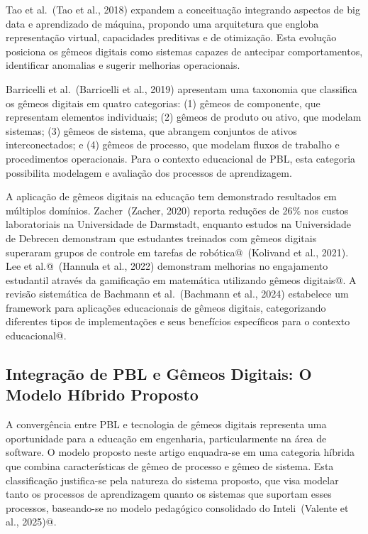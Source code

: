 \documentclass[english, spanish, brazilian]{modelo_dt}
\begin{document}
Tao et al.\@~(Tao et al., 2018) expandem a conceituação integrando aspectos de
big data e aprendizado de máquina, propondo uma arquitetura que engloba
representação virtual, capacidades preditivas e de otimização\@. Esta evolução
posiciona os gêmeos digitais como sistemas capazes de antecipar comportamentos,
identificar anomalias e sugerir melhorias operacionais\@.

Barricelli et al.\@~(Barricelli et al., 2019) apresentam uma taxonomia que
classifica os gêmeos digitais em quatro categorias: (1) gêmeos de componente,
que representam elementos individuais; (2) gêmeos de produto ou ativo, que
modelam sistemas; (3) gêmeos de sistema, que abrangem conjuntos de ativos
interconectados; e (4) gêmeos de processo, que modelam fluxos de trabalho e
procedimentos operacionais\@. Para o contexto educacional de PBL, esta
categoria possibilita modelagem e avaliação dos processos de aprendizagem\@.

A aplicação de gêmeos digitais na educação tem demonstrado resultados em
múltiplos domínios. Zacher~(Zacher, 2020) reporta reduções de 26\% nos custos
laboratoriais na Universidade de Darmstadt, enquanto estudos na Universidade de
Debrecen demonstram que estudantes treinados com gêmeos digitais superaram
grupos de controle em tarefas de robótica@~(Kolivand et al., 2021). Lee et
al.@~(Hannula et al., 2022) demonstram melhorias no engajamento estudantil
através da gamificação em matemática utilizando gêmeos digitais@. A revisão
sistemática de Bachmann et al.~(Bachmann et al., 2024) estabelece um framework
para aplicações educacionais de gêmeos digitais, categorizando diferentes tipos
de implementações e seus benefícios específicos para o contexto educacional@.

\subsection{Integração de PBL e Gêmeos Digitais: O Modelo Híbrido Proposto}

A convergência entre PBL e tecnologia de gêmeos digitais representa uma
oportunidade para a educação em engenharia, particularmente na área de
software\@. O modelo proposto neste artigo enquadra-se em uma categoria híbrida
que combina características de gêmeo de processo e gêmeo de sistema\@. Esta
classificação justifica-se pela natureza do sistema proposto, que visa modelar
tanto os processos de aprendizagem quanto os sistemas que suportam esses
processos, baseando-se no modelo pedagógico consolidado do Inteli~(Valente et al., 2025)@.
\end{document}
